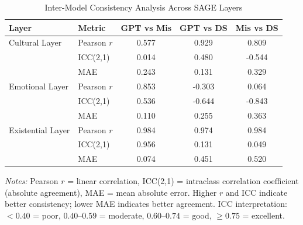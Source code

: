 
\begin{table}[t]
\centering
\caption{Inter-Model Consistency Analysis Across SAGE Layers}
\label{tab:inter_model_consistency}
\small
\begin{tabular}{llccc}
\toprule
\textbf{Layer} & \textbf{Metric} & \textbf{GPT vs Mis} & \textbf{GPT vs DS} & \textbf{Mis vs DS} \\
\midrule
Cultural Layer  & Pearson $r$ & 0.577 & 0.929 & 0.809 \\
                & ICC(2,1) & 0.014 & 0.480 & -0.544 \\
                & MAE & 0.243 & 0.131 & 0.329 \\
\midrule
Emotional Layer & Pearson $r$ & 0.853 & -0.303 & 0.064 \\
                & ICC(2,1) & 0.536 & -0.644 & -0.843 \\
                & MAE & 0.110 & 0.255 & 0.363 \\
\midrule
Existential Layer & Pearson $r$ & 0.984 & 0.974 & 0.984 \\
                & ICC(2,1) & 0.956 & 0.131 & 0.049 \\
                & MAE & 0.074 & 0.451 & 0.520 \\
\bottomrule
\end{tabular}
\vspace{0.1cm}

\small
\textit{Notes:} Pearson $r$ = linear correlation, ICC(2,1) = intraclass correlation coefficient (absolute agreement),
MAE = mean absolute error. Higher $r$ and ICC indicate better consistency; lower MAE indicates better agreement.
ICC interpretation: $<0.40$ = poor, $0.40$--$0.59$ = moderate, $0.60$--$0.74$ = good, $\geq 0.75$ = excellent.
\end{table}
